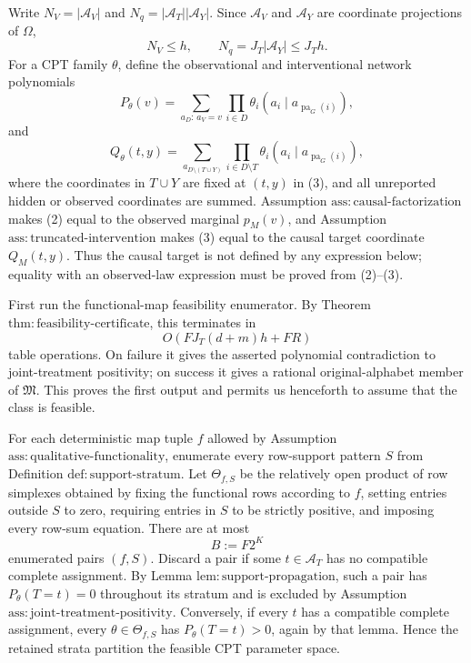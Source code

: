 Write \(N_V=|\mathcal A_V|\) and \(N_q=|\mathcal A_T||\mathcal A_Y|\). Since \(\mathcal A_V\) and \(\mathcal A_Y\) are coordinate projections of \(\Omega\),
\[
 N_V\le h,
 \qquad
 N_q=J_T|\mathcal A_Y|\le J_Th.
 \tag{1}
\]
For a CPT family \(\theta\), define the observational and interventional network polynomials
\[
 P_\theta(v)
 =\sum_{a_D:\,a_V=v}\prod_{i\in D}
   \theta_i(a_i\mid a_{\operatorname{pa}_G(i)}),
 \tag{2}
\]
and
\[
 Q_\theta(t,y)
 =\sum_{a_{D\setminus(T\cup Y)}}
   \prod_{i\in D\setminus T}
   \theta_i(a_i\mid a_{\operatorname{pa}_G(i)}),
 \tag{3}
\]
where the coordinates in \(T\cup Y\) are fixed at \((t,y)\) in (3), and all unreported hidden or observed coordinates are summed. Assumption \(\mathrm{ass:causal\text{-}factorization}\) makes (2) equal to the observed marginal \(p_M(v)\), and Assumption \(\mathrm{ass:truncated\text{-}intervention}\) makes (3) equal to the causal target coordinate \(Q_M(t,y)\). Thus the causal target is not defined by any expression below; equality with an observed-law expression must be proved from (2)--(3).

First run the functional-map feasibility enumerator. By Theorem \(\mathrm{thm:feasibility\text{-}certificate}\), this terminates in
\[
 O\!\left(FJ_T(d+m)h+FR\right)
 \tag{4}
\]
table operations. On failure it gives the asserted polynomial contradiction to joint-treatment positivity; on success it gives a rational original-alphabet member of \(\mathfrak M\). This proves the first output and permits us henceforth to assume that the class is feasible.

For each deterministic map tuple \(f\) allowed by Assumption \(\mathrm{ass:qualitative\text{-}functionality}\), enumerate every row-support pattern \(S\) from Definition \(\mathrm{def:support\text{-}stratum}\). Let \(\Theta_{f,S}\) be the relatively open product of row simplexes obtained by fixing the functional rows according to \(f\), setting entries outside \(S\) to zero, requiring entries in \(S\) to be strictly positive, and imposing every row-sum equation. There are at most
\[
 B:=F2^K
 \tag{5}
\]
enumerated pairs \((f,S)\). Discard a pair if some \(t\in\mathcal A_T\) has no compatible complete assignment. By Lemma \(\mathrm{lem:support\text{-}propagation}\), such a pair has \(P_\theta(T=t)=0\) throughout its stratum and is excluded by Assumption \(\mathrm{ass:joint\text{-}treatment\text{-}positivity}\). Conversely, if every \(t\) has a compatible complete assignment, every \(\theta\in\Theta_{f,S}\) has \(P_\theta(T=t)>0\), again by that lemma. Hence the retained strata partition the feasible CPT parameter space.

